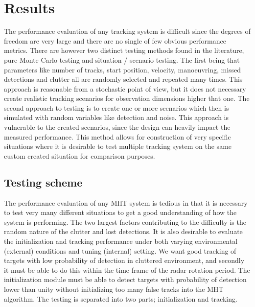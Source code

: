 \chapter{Results}\label{chapter:results}
The performance evaluation of any tracking system is difficult since the degrees of freedom are very large and there are no single of few obvious performance metrics. There are however two distinct testing methods found in the literature, pure Monte Carlo testing and situation / scenario testing. The first being that parameters like number of tracks, start position, velocity, manoeuvring, missed detections and clutter all are randomly selected and repeated many times. This approach is reasonable from a stochastic point of view, but it does not necessary create realistic tracking scenarios for observation dimensions higher that one. The second approach to testing is to create one or more scenarios which then is simulated with random variables like detection and noise. This approach is vulnerable to the created scenarios, since the design can heavily impact the measured performance. This method allows for construction of very specific situations where it is desirable to test multiple tracking system on the same custom created situation for comparison purposes.

\section{Testing scheme}
The performance evaluation of any MHT system is tedious in that it is necessary to test very many different situations to get a good understanding of how the system is performing. The two largest factors contributing to the difficulty is the random nature of the clutter and lost detections. It is also desirable to evaluate the initialization and tracking performance under both varying environmental (external) conditions and tuning (internal) setting. We want good tracking of targets with low probability of detection in cluttered environment, and secondly it must be able to do this within the time frame of the radar rotation period. The initialization module must be able to detect targets with probability of detection lower than unity without initializing too many false tracks into the MHT algorithm. The testing is separated into two parts; initialization and tracking.

